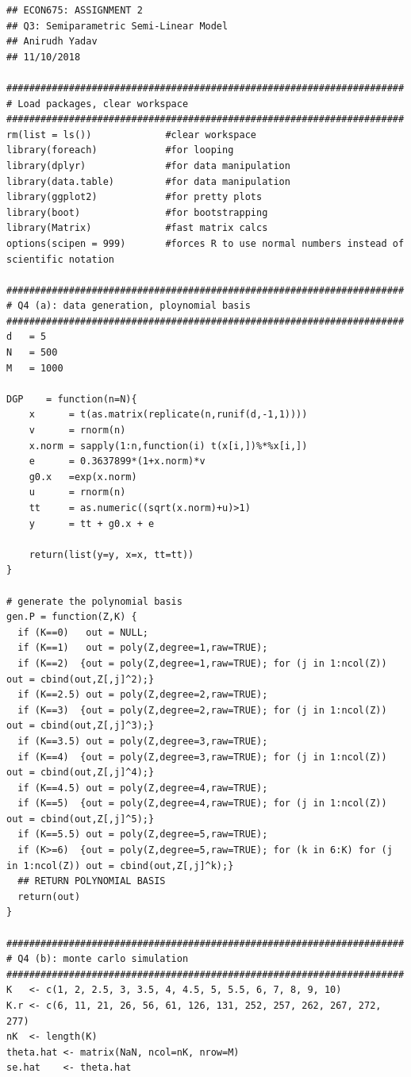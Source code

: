 \documentclass[12pt]{article}
\begin{document}
\begin{verbatim}
## ECON675: ASSIGNMENT 2
## Q3: Semiparametric Semi-Linear Model
## Anirudh Yadav 
## 11/10/2018

######################################################################
# Load packages, clear workspace
######################################################################
rm(list = ls())             #clear workspace
library(foreach)            #for looping
library(dplyr)              #for data manipulation
library(data.table)         #for data manipulation
library(ggplot2)            #for pretty plots
library(boot)               #for bootstrapping
library(Matrix)             #fast matrix calcs
options(scipen = 999)       #forces R to use normal numbers instead of scientific notation

######################################################################
# Q4 (a): data generation, ploynomial basis
######################################################################
d   = 5
N   = 500
M   = 1000

DGP    = function(n=N){
    x      = t(as.matrix(replicate(n,runif(d,-1,1))))
    v      = rnorm(n)
    x.norm = sapply(1:n,function(i) t(x[i,])%*%x[i,])
    e      = 0.3637899*(1+x.norm)*v
    g0.x   =exp(x.norm)
    u      = rnorm(n)
    tt     = as.numeric((sqrt(x.norm)+u)>1)
    y      = tt + g0.x + e
 
    return(list(y=y, x=x, tt=tt))
}

# generate the polynomial basis
gen.P = function(Z,K) {
  if (K==0)   out = NULL;
  if (K==1)   out = poly(Z,degree=1,raw=TRUE);
  if (K==2)  {out = poly(Z,degree=1,raw=TRUE); for (j in 1:ncol(Z)) out = cbind(out,Z[,j]^2);}
  if (K==2.5) out = poly(Z,degree=2,raw=TRUE);
  if (K==3)  {out = poly(Z,degree=2,raw=TRUE); for (j in 1:ncol(Z)) out = cbind(out,Z[,j]^3);}
  if (K==3.5) out = poly(Z,degree=3,raw=TRUE);
  if (K==4)  {out = poly(Z,degree=3,raw=TRUE); for (j in 1:ncol(Z)) out = cbind(out,Z[,j]^4);}
  if (K==4.5) out = poly(Z,degree=4,raw=TRUE);
  if (K==5)  {out = poly(Z,degree=4,raw=TRUE); for (j in 1:ncol(Z)) out = cbind(out,Z[,j]^5);}
  if (K==5.5) out = poly(Z,degree=5,raw=TRUE);
  if (K>=6)  {out = poly(Z,degree=5,raw=TRUE); for (k in 6:K) for (j in 1:ncol(Z)) out = cbind(out,Z[,j]^k);}
  ## RETURN POLYNOMIAL BASIS
  return(out)
}

######################################################################
# Q4 (b): monte carlo simulation
######################################################################
K   <- c(1, 2, 2.5, 3, 3.5, 4, 4.5, 5, 5.5, 6, 7, 8, 9, 10)
K.r <- c(6, 11, 21, 26, 56, 61, 126, 131, 252, 257, 262, 267, 272, 277)
nK  <- length(K)
theta.hat <- matrix(NaN, ncol=nK, nrow=M)
se.hat    <- theta.hat



\end{verbatim}
\end{document}

